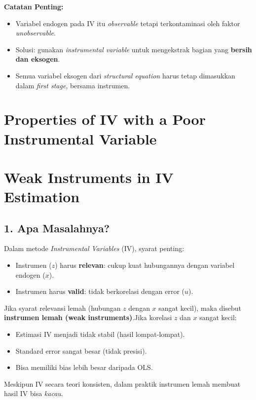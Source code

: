 \documentclass[]{article}
\begin{document}
\vspace{0.5cm}

\noindent
\textbf{Catatan Penting:}
\begin{itemize}
    \item Variabel endogen pada IV itu \textit{observable} tetapi terkontaminasi oleh faktor \textit{unobservable}.
    \item Solusi: gunakan \textit{instrumental variable} untuk mengekstrak bagian yang \textbf{bersih dan eksogen}.
    \item Semua variabel eksogen dari \textit{structural equation} harus tetap dimasukkan dalam \textit{first stage}, bersama instrumen.
\end{itemize}

 


\section{Properties of IV with a Poor Instrumental Variable}
\section*{Weak Instruments in IV Estimation}

\subsection*{1. Apa Masalahnya?}
Dalam metode \textit{Instrumental Variables} (IV), syarat penting:
\begin{itemize}
    \item Instrumen ($z$) harus \textbf{relevan}: cukup kuat hubungannya dengan variabel endogen ($x$).
    \item Instrumen harus \textbf{valid}: tidak berkorelasi dengan error ($u$).
\end{itemize}
Jika syarat relevansi lemah (hubungan $z$ dengan $x$ sangat kecil), maka disebut \textbf{instrumen lemah (weak instruments)}.Jika korelasi $z$ dan $x$ sangat kecil:
\begin{itemize}
    \item Estimasi IV menjadi tidak stabil (hasil lompat-lompat).
    \item Standard error sangat besar (tidak presisi).
    \item Bisa memiliki bias lebih besar daripada OLS.
\end{itemize}
Meskipun IV secara teori konsisten, dalam praktik instrumen lemah membuat hasil IV bisa \emph{kacau}.
\end{document}
